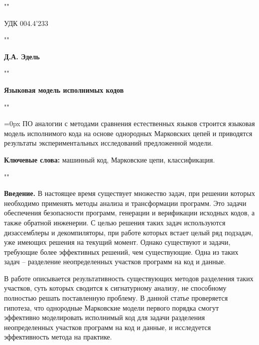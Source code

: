 \documentclass{book}
\begin{document}
\pagestyle{fancy}
\fancyhead{} %
\fancyhead[LE, RO]{\textbf{\thepage}}
\fancyfoot{} %

\par{""}

\noindent\small{УДК 004.4'233}

\par{""}

\noindent\normalsize{\textbf{Д.А. Эдель}}

\par{""}

\noindent\Large{\textbf{Языковая модель исполнимых кодов}}

\par{""}

\begin{large}
\hangindent=1.7cm
\parindent=1.7cm
\parskip=0px
ПО аналогии с методами сравнения естественных языков строится языковая модель
исполнимого кода на основе однородных Марковских цепей и приводятся результаты
экспериментальных исследований предложенной модели.

\textbf{Ключевые слова:} машинный код, Марковские цепи, классификация.
\end{large}

\par{""}

\textbf{Введение.} В настоящее время существует множество задач, при решении которых необходимо 
применять методы анализа и трансформации программ. Это задачи обеспечения безопасности программ, генерации и 
верификации исходных кодов, а также обратной инженерии. С целью решения таких задач используются дизассемблеры и декомпиляторы, 
при работе которых встает целый ряд подзадач, уже имеющих решения на текущий момент. Однако существуют и задачи, 
требующие более эффективных решений, чем существующие. Одна из таких задач – разделение неопределенных участков программ 
на код и данные. 

В работе \cite{Linn} 
описывается результативность существующих методов разделения таких
участков, суть которых сводится к сигнатурному анализу, не способному полностью решать 
поставленную проблему. В данной статье проверяется гипотеза, что однородные
Марковские модели первого порядка смогут эффективно моделировать исполнимый код
для задачи разделения неопределенных участков программ на код и данные, и исследуется 
эффективность метода на практике.
\end{document}
